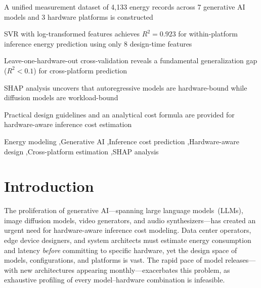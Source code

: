 \documentclass[review,12pt,authoryear]{elsarticle}
\begin{document}
\begin{frontmatter}
\begin{highlights}
\item A unified measurement dataset of 4,133 energy records across 7 generative AI models and 3 hardware platforms is constructed
\item SVR with log-transformed features achieves $R^2 = 0.923$ for within-platform inference energy prediction using only 8 design-time features
\item Leave-one-hardware-out cross-validation reveals a fundamental generalization gap ($R^2 < 0.1$) for cross-platform prediction
\item SHAP analysis uncovers that autoregressive models are hardware-bound while diffusion models are workload-bound
\item Practical design guidelines and an analytical cost formula are provided for hardware-aware inference cost estimation
\end{highlights}

\begin{keyword}
Energy modeling \sep Generative AI \sep Inference cost prediction \sep Hardware-aware design \sep Cross-platform estimation \sep SHAP analysis
\end{keyword}

\end{frontmatter}

\linenumbers

\section{Introduction}
\label{sec:introduction}

The proliferation of generative AI---spanning large language models~(LLMs), image diffusion models, video generators, and audio synthesizers---has created an urgent need for hardware-aware inference cost modeling.
Data center operators, edge device designers, and system architects must estimate energy consumption and latency \emph{before} committing to specific hardware, yet the design space of models, configurations, and platforms is vast.
The rapid pace of model releases---with new architectures appearing monthly---exacerbates this problem, as exhaustive profiling of every model--hardware combination is infeasible.
\end{document}
